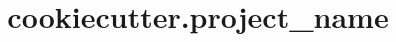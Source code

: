 \documentclass{beamer}
\title{
    {{ cookiecutter.project_name }}
}
\begin{document}
\beginframes
\end{document}
